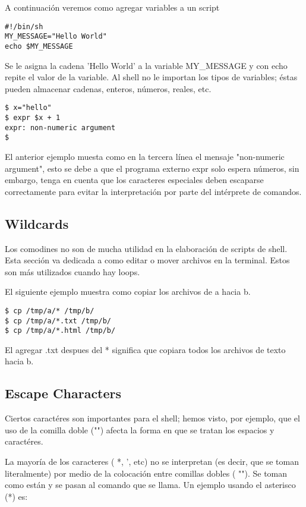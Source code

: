 \documentclass[12pt]{article}
\begin{document}
A continuación veremos como agregar variables a un script

\begin{verbatim}
#!/bin/sh
MY_MESSAGE="Hello World"
echo $MY_MESSAGE
\end{verbatim}

Se le asigna la cadena 'Hello World' a la variable MY\_MESSAGE y con echo repite el valor de la variable. Al shell no le importan los tipos de variables; éstas pueden almacenar cadenas, enteros, números, reales, etc.

\begin{verbatim}
$ x="hello"
$ expr $x + 1
expr: non-numeric argument
$
\end{verbatim}

El anterior ejemplo muesta como en la tercera línea el mensaje "non-numeric argument", esto se debe a que el programa externo expr solo espera números, sin embargo, tenga en cuenta que los caracteres especiales deben escaparse correctamente para evitar la interpretación por parte del intérprete de comandos.

\subsection{Wildcards}

Los comodines no son de mucha utilidad en la elaboración de scripts de shell. Esta sección va dedicada a como editar o mover archivos en la terminal. Estos son más utilizados cuando hay loops.

El siguiente ejemplo muestra como copiar los archivos de a hacia b.

\begin{verbatim}
$ cp /tmp/a/* /tmp/b/
$ cp /tmp/a/*.txt /tmp/b/
$ cp /tmp/a/*.html /tmp/b/
\end{verbatim}

El agregar .txt despues del * significa que copiara todos los archivos de texto hacia b.

\subsection{Escape Characters}

Ciertos caractéres son importantes para el shell; hemos visto, por ejemplo, que el uso de la comilla doble ("") afecta la forma en que se tratan los espacios y caractéres.

La mayoría de los caracteres ( *, ', etc) no se interpretan (es decir, que se toman literalmente) por medio de la colocación entre comillas dobles ( ""). Se toman como están y se pasan al comando que se llama. Un ejemplo usando el asterisco (*) es:
\end{document}

